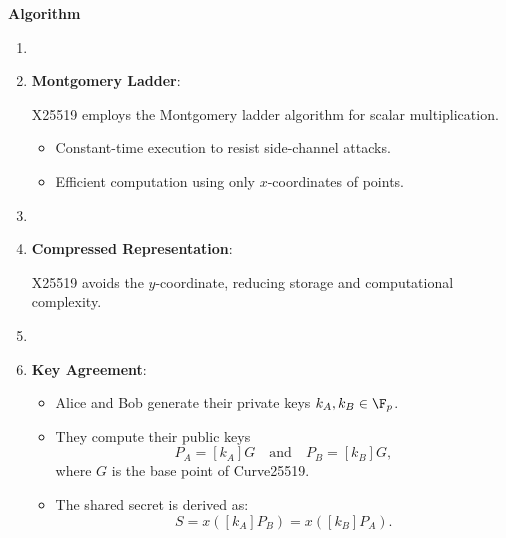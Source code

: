 \textbf{\large Algorithm}
\begin{enumerate}
	\item[]
	\item \textbf{Montgomery Ladder}:
	
	X25519 employs the Montgomery ladder algorithm for scalar multiplication. 
	\begin{itemize}
		\item[$\bullet$] Constant-time execution to resist side-channel attacks.
		\item[$\bullet$] Efficient computation using only $x$-coordinates of points.
	\end{itemize}
	\item[]
	\item \textbf{Compressed Representation}:
		
	X25519 avoids the $y$-coordinate, reducing storage and computational complexity.
	\item[]
	\item \textbf{Key Agreement}:
	\begin{itemize}
		\item[$\bullet$] Alice and Bob generate their private keys $k_A,k_B\in\F_p$.​
		\item[$\bullet$] They compute their public keys \[
		P_A=[k_A]G\quad\text{and}\quad P_B=[k_B]G,
		\] where $G$ is the base point of Curve25519. 
		\item[$\bullet$] The shared secret is derived as: \[
		S=x([k_A]P_B)=x([k_B]P_A).
		\]
	\end{itemize}
\end{enumerate}